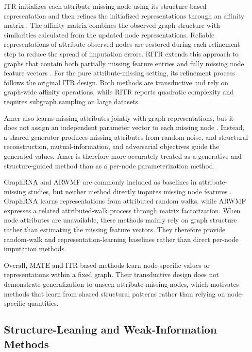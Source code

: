 ITR initializes each attribute-missing node using its structure-based representation and then refines the initialized representations through an affinity matrix \cite{tu2022initializing}. The affinity matrix combines the observed graph structure with similarities calculated from the updated node representations. Reliable representations of attribute-observed nodes are restored during each refinement step to reduce the spread of imputation errors. RITR extends this approach to graphs that contain both partially missing feature entries and fully missing node feature vectors \cite{tu2024revisiting}. For the pure attribute-missing setting, its refinement process follows the original ITR design. Both methods are transductive and rely on graph-wide affinity operations, while RITR reports quadratic complexity and requires subgraph sampling on large datasets.

Amer also learns missing attributes jointly with graph representations, but it does not assign an independent parameter vector to each missing node \cite{jin2022amer}. Instead, a shared generator produces missing attributes from random noise, and structural reconstruction, mutual-information, and adversarial objectives guide the generated values. Amer is therefore more accurately treated as a generative and structure-guided method than as a per-node parameterization method.

GraphRNA and ARWMF are commonly included as baselines in attribute-missing studies, but neither method directly imputes missing node features \cite{huang2019graph,chen2019attributed}. GraphRNA learns representations from attributed random walks, while ARWMF expresses a related attributed-walk process through matrix factorization. When node attributes are unavailable, these methods mainly rely on graph structure rather than estimating the missing feature vectors. They therefore provide random-walk and representation-learning baselines rather than direct per-node imputation methods.

Overall, MATE and ITR-based methods learn node-specific values or representations within a fixed graph. Their transductive design does not demonstrate generalization to unseen attribute-missing nodes, which motivates methods that learn from shared structural patterns rather than relying on node-specific quantities.


\subsection{Structure-Leaning and Weak-Information Methods}

